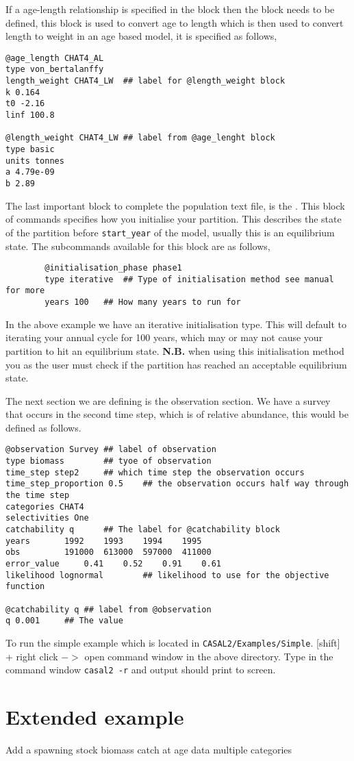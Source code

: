 If a age-length relationship is specified in the  block then the  block needs to be defined, this block is used to convert age to length which is then used to convert length to weight in an age based model, it is specified as follows,
{\small{\begin{verbatim}
@age_length CHAT4_AL
type von_bertalanffy
length_weight CHAT4_LW	## label for @length_weight block
k 0.164
t0 -2.16
linf 100.8

@length_weight CHAT4_LW	## label from @age_lenght block
type basic
units tonnes
a 4.79e-09 
b 2.89 
		\end{verbatim}}}

The last important block to complete the population text file, is the . This block of commands specifies how you initialise your partition. This describes the state of the partition before \texttt{start\_year} of the model, usually this is an equilibrium state. The subcommands available for this block are as follows,
{\small{\begin{verbatim}
		@initialisation_phase phase1
		type iterative	## Type of initialisation method see manual for more
		years 100	## How many years to run for
		\end{verbatim}}}

In the above example we have an iterative initialisation type. This will default to iterating your annual cycle for 100 years, which may or may not cause your partition to hit an equilibrium state. \textbf{N.B.} when using this initialisation method you as the user must check if the partition has reached an acceptable equilibrium state.

The next section we are defining is the observation section. We have a survey that occurs in the second time step, which is of relative abundance, this would be defined as follows.

{\small{\begin{verbatim}
@observation Survey	## label of observation
type biomass 		## tyoe of observation
time_step step2		## which time step the observation occurs
time_step_proportion 0.5	## the observation occurs half way through the time step
categories CHAT4
selectivities One
catchability q		## The label for @catchability block
years 		1992 	1993 	1994 	1995 	
obs 		191000	613000	597000	411000	
error_value 	0.41	0.52	0.91	0.61
likelihood lognormal		## likelihood to use for the objective function

@catchability q	## label from @observation
q 0.001		## The value
		\end{verbatim}}}

To run the simple example which is located in \texttt{CASAL2/Examples/Simple}. [shift] + right click $->$ open command window in the above directory. Type in the command window \texttt{casal2 -r} and output should print to screen.

\section{Extended example}\label{Sec:exte}
Add a spawning stock biomass
catch at age data
multiple categories

